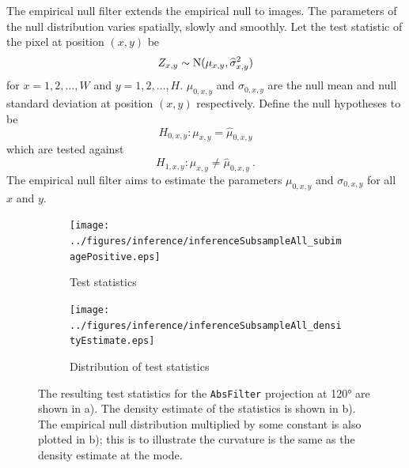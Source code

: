 The empirical null filter extends the empirical null to images. The parameters of the null distribution varies spatially, slowly and smoothly. Let the test statistic of the pixel at position $(x,y)$ be
\begin{equation}
Z_{x,y}\sim\operatorname{N}(\mu_{x,y},\widehat{\sigma}_{x,y}^2)
\end{equation}
for $x=1,2,\dotsc,W$ and $y=1,2,\dotsc,H$. $\mu_{0,x,y}$ and $\sigma_{0,x,y}$ are the null mean and null standard deviation at position $(x,y)$ respectively. Define the null hypotheses to be
\begin{equation}
  H_{0,x,y}:\mu_{x,y}=\widehat{\mu}_{0,x,y}
\end{equation}
which are tested against
\begin{equation}
  H_{1,x,y}:\mu_{x,y}\neq\widehat{\mu}_{0,x,y} \ .
\end{equation}
 The empirical null filter aims to estimate the parameters $\mu_{0,x,y}$ and $\sigma_{0,x,y}$ for all $x$ and $y$.
 
 \begin{figure}[t]
  \centering
  \begin{subfigure}[b]{\subSize}
    \texttt{[image: ../figures/inference/inferenceSubsampleAll\_subimagePositive.eps]}
    \caption{Test statistics}
  \end{subfigure}
  \begin{subfigure}[b]{\subSize}
    \texttt{[image: ../figures/inference/inferenceSubsampleAll\_densityEstimate.eps]}
    \caption{Distribution of test statistics}
  \end{subfigure}
  \caption{The resulting test statistics for the \texttt{AbsFilter} projection at \ang{120} are shown in a). The density estimate of the statistics is shown in b). The empirical null distribution multiplied by some constant is also plotted in b); this is to illustrate the curvature is the same as the density estimate at the mode.}
  \label{fig:inference_inferenceSubsampleAll}
\end{figure}

